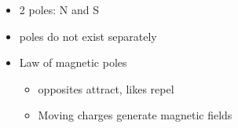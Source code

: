 \documentclass[12pt]{article}
\begin{document}
	\begin{itemize}
		\item 2 poles: N and S
		\item poles do not exist separately
		\item Law of magnetic poles
			\begin{itemize}
				\item opposites attract, likes repel
				\item Moving charges generate magnetic fields
			\end{itemize}
	\end{itemize}
\end{document}
